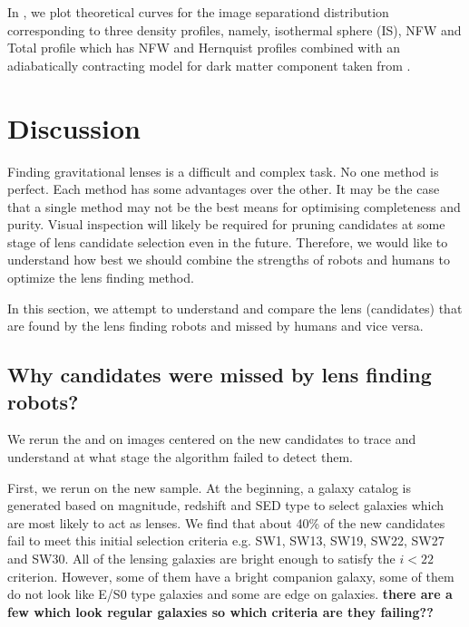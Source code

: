 \documentclass[useAMS,usenatbib,a4paper]{mn2e}
\begin{document}
In , we plot theoretical curves for the image
separationd distribution corresponding to three density profiles,
namely, isothermal sphere (IS), NFW \citep{Navarro1997} and Total profile which has
NFW and Hernquist profiles combined with an adiabatically contracting model for
dark matter component \citep{Gnedin2004} taken from \citet{More2012}.
 



\section{Discussion}
\label{sec:discuss}

Finding gravitational lenses is a difficult and complex task. No one
method is perfect. Each method has some advantages over the other. It
may be the case that a single method may not be the best means for
optimising completeness and purity. Visual inspection will likely be
required for pruning candidates at some stage of lens candidate
selection even in the future. Therefore, we would like to understand how
best we should combine the strengths of robots and humans to optimize
the lens finding method. 
  
In this section, we attempt to understand and compare the lens
(candidates) that are found by the lens finding robots and missed by humans
and vice versa.

\subsection{Why \sw candidates were missed by lens finding robots?}
We rerun the \rf and \af on images centered on the new \sw candidates to
trace and understand at what stage the algorithm failed to detect them.

First, we rerun \rf on the new \sw sample. At the beginning, a galaxy
catalog is generated based on magnitude, redshift and SED type
\citep[see]{Gavazzi2014} to select galaxies which are most likely to act
as lenses. We find that about 40\% of the new \sw candidates fail to
meet this initial selection criteria e.g. SW1, SW13, SW19, SW22, SW27
and SW30.  All of the lensing galaxies are bright enough to satisfy the
$i<22$ criterion. However, some of them have a bright companion galaxy,
some of them do not look like E/S0 type galaxies and some are edge on
galaxies. {\bf there are a few which look regular galaxies so which
criteria are they failing??} 
\end{document}
